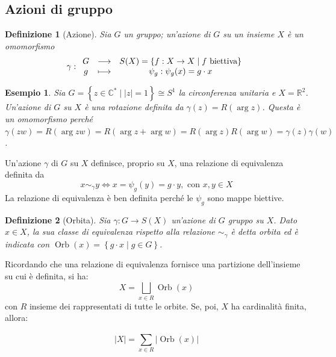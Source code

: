 \documentclass[11pt]{scrartcl}
\theoremstyle{style1}
\newtheorem{definizione}{Definizione}[section]
\newtheorem{esempio}{Esempio}[section]
\newenvironment{boxenv}[1][]{
    \begin{eqbox}[#1]
    }{
   \end{eqbox}
}
\numberwithin{equation}{subsection}
\begin{document}
\subsection{Azioni di gruppo}
\begin{definizione}
	[Azione]
	Sia $G$ un gruppo; un'azione di $G$ su un insieme $X$ \`e un omomorfismo
	\[
	\gamma : 
	\begin{array}
		{c c c}
		G &\longrightarrow & S(X) = \left\{ f : X \to X  \mid f \text{ biettiva} \right\} \\
		g & \longmapsto & \psi _g : \psi_g(x) = g \cdot x
	\end{array}
	\] 
\end{definizione}
\begin{esempio}
Sia $G = \left\{ z \in \mathbb{C}^*  \mid  \lvert z \rvert =1 \right\} \cong S^1$ la circonferenza unitaria e $X = \mathbb{R}^2$.
Un'azione di $G$ su $X$ \`e una rotazione definita da $\gamma(z) = R(\operatorname{arg} z)$.
Questa \`e un omomorfismo perch\'e $\gamma(zw) = R(\operatorname{arg} zw)  = R(\operatorname{arg} z +  \operatorname{arg} w) = R(\operatorname{arg} z) R(\operatorname{arg} w)= \gamma(z) \gamma(w)$.
\end{esempio}
\noindent Un'azione $\gamma$ di $G$ su $X$ definisce, proprio su $X$, una relazione di equivalenza definita da 
\begin{equation}
	x \sim _\gamma y \iff x=\psi _g(y)=g \cdot y, \text{ con } x,y \in X
\end{equation}
La relazione di equivalenza \`e ben definita perch\'e le $\psi _g$ sono mappe biettive.
\begin{definizione}
	[Orbita]
	Sia $\gamma :G \to S(X)$ un'azione di $G$ gruppo su $X$. Dato $x \in X$, la sua classe di equivalenza rispetto alla relazione $\sim _\gamma$ \`e detta \textit{orbita} ed \`e indicata con $\operatorname{Orb} (x) = \left\{ g \cdot  x  \mid g \in G\right\} $.
\end{definizione}
\noindent Ricordando che una relazione di equivalenza fornisce una partizione dell'insieme su cui \`e definita, si ha:
\begin{equation}
	X = \bigsqcup_{x \in R} \operatorname{Orb} (x)
\end{equation}
con $R$ insieme dei rappresentati di tutte le orbite.
Se, poi, $X$ ha cardinalit\`a finita, allora:
\begin{boxenv}[]
\begin{equation}
	\lvert X \rvert  = \sum_{x \in R}^{} \lvert \operatorname{Orb} (x) \rvert 
\end{equation}
\end{boxenv}
\end{document}
